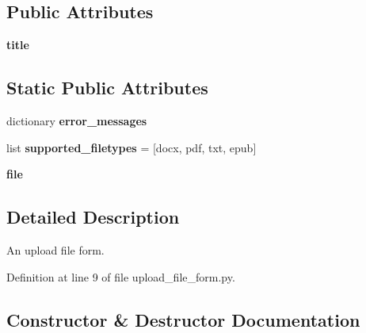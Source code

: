 \subsection*{Public Attributes}
\begin{DoxyCompactItemize}
\item 
\mbox{\label{classcapstoneproject_1_1app__forms_1_1upload__file__form_1_1_upload_file_form_a3eab7915f5eb9dba2c081a159acfedbf}} 
{\bfseries title}
\end{DoxyCompactItemize}
\subsection*{Static Public Attributes}
\begin{DoxyCompactItemize}
\item 
dictionary {\bfseries error\+\_\+messages}
\item 
\mbox{\label{classcapstoneproject_1_1app__forms_1_1upload__file__form_1_1_upload_file_form_a02a533e4a922d7485ba7a926dc00ada0}} 
list {\bfseries supported\+\_\+filetypes} = \mbox{[}\textquotesingle{}docx\textquotesingle{}, \textquotesingle{}pdf\textquotesingle{}, \textquotesingle{}txt\textquotesingle{}, \textquotesingle{}epub\textquotesingle{}\mbox{]}
\item 
{\bfseries file}
\end{DoxyCompactItemize}


\subsection{Detailed Description}
\begin{DoxyVerb}An upload file form.
\end{DoxyVerb}
 

Definition at line 9 of file upload\+\_\+file\+\_\+form.\+py.



\subsection{Constructor \& Destructor Documentation}
\mbox{\label{classcapstoneproject_1_1app__forms_1_1upload__file__form_1_1_upload_file_form_a42510cfe304a661a8a5c15fe3da8e8e0}} 
